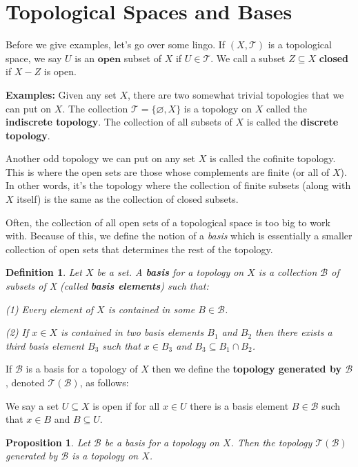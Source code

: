 \documentclass[a4paper]{article}
\newtheorem{prop}[theorem]{Proposition}
\newtheorem{definition}[theorem]{Definition}
\numberwithin{theorem}{section}
\begin{document}
\section{Topological Spaces and Bases}
Before we give examples, let's go over some lingo. If $(X,\mathcal{T})$ is a topological space, we say $U$ is an $\textbf{open}$ subset of $X$ if $U \in \mathcal{T}$. We call a subset $Z \subseteq X$ \textbf{closed} if $X - Z$ is open.

\textbf{Examples:} Given any set $X$, there are two somewhat trivial topologies that we can put on $X$. The collection $\mathcal{T} = \{\varnothing, X\}$ is a topology on $X$ called the \textbf{indiscrete topology}. The collection of all subsets of $X$ is called the \textbf{discrete topology}. 

Another odd topology we can put on any set $X$ is called the cofinite topology. This is where the open sets are those whose complements are finite (or all of $X$). In other words, it's the topology where the collection of finite subsets (along with $X$ itself) is the same as the collection of closed subsets. 



Often, the collection of all open sets of a topological space is too big to work with. Because of this, we define the notion of a \textit{basis} which is essentially a smaller collection of open sets that determines the rest of the topology.

\begin{definition} \label{basis}
Let $X$ be a set. A \textbf{basis} for a topology on $X$ is a collection $\mathcal{B}$ of subsets of X (called \textbf{basis elements}) such that:

(1) Every element of $X$ is contained in some $B \in \mathcal{B}$.

(2) If $x \in X$ is contained in two basis elements $B_1$ and $B_2$ then there exists a third basis element $B_3$ such that $x \in B_3$ and $B_3 \subseteq B_1 \cap B_2$.
\end{definition}

If $\mathcal{B}$ is a basis for a topology of $X$ then we define the \textbf{topology generated by $\mathcal{B}$}, denoted $\mathcal{T}(\mathcal{B})$, as follows:

We say a set $U \subseteq X$ is open if for all $x \in U$ there is a basis element $B \in \mathcal{B}$ such that $x \in B$ and $B \subseteq U$.

\begin{prop}
Let $\mathcal{B}$ be a basis for a topology on $X$. Then the topology $\mathcal{T}(\mathcal{B})$ generated by $\mathcal{B}$ is a topology on $X$.
\end{prop}
\end{document}
